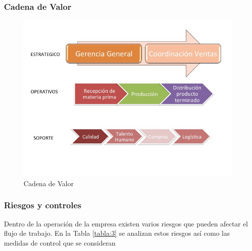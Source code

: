 \documentclass[12pt, a4paper]{article}
\begin{document}
\subsubsection{Cadena de Valor}
\begin{figure}[H]
  \centering
  
    \includegraphics[width=1.1\textwidth]{CadenadeValor.jpg}
  \captionsetup{justification=centering} %
  \caption{Cadena de Valor}
  \label{figura:2}
\end{figure}

\subsubsection{Riesgos y controles}
Dentro de la operación de la empresa existen varios riesgos que pueden afectar el flujo de trabajo. En la Tabla \ref{tabla:3} se analizan estos riesgos así como las medidas de control que se consideran
\end{document}
